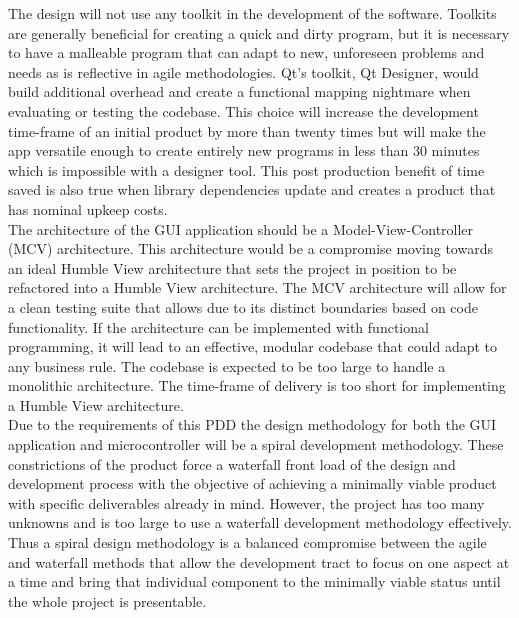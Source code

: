 \documentclass[12pt]{article}
\begin{document}
\indent
The design will not use any toolkit in the development of the software.  Toolkits are generally beneficial for creating a quick and dirty program, but it is necessary to have a malleable program that can adapt to new, unforeseen problems and needs as is reflective in agile methodologies.  Qt’s toolkit, Qt Designer, would build additional overhead and create a functional mapping nightmare when evaluating or testing the codebase.  This choice will increase the development time-frame of an initial product by more than twenty times but will make the app versatile enough to create entirely new programs in less than 30 minutes which is impossible with a designer tool.  This post production benefit of time saved is also true when library dependencies update and creates a product that has nominal upkeep costs.\\

\indent
The architecture of the GUI application should be a Model-View-Controller (MCV) architecture.  This architecture would be a compromise moving towards an ideal Humble View architecture that sets the project in position to be refactored into a Humble View architecture.  The MCV architecture will allow for a clean testing suite that allows due to its distinct boundaries based on code functionality.  If the architecture can be implemented with functional programming, it will lead to an effective, modular codebase that could adapt to any business rule.  The codebase is expected to be too large to handle a monolithic architecture.  The time-frame of delivery is too short for implementing a Humble View architecture.\\

\indent
Due to the requirements of this PDD the design methodology for both the GUI application and microcontroller will be a spiral development methodology.  These constrictions of the product force a waterfall front load of the design and development process with the objective of achieving a minimally viable product with specific deliverables already in mind.  However, the project has too many unknowns and is too large to use a waterfall development methodology effectively.  Thus a spiral design methodology is a balanced compromise between the agile and waterfall methods that allow the development tract to focus on one aspect at a time and bring that individual component to the minimally viable status until the whole project is presentable.\\
\hfill \\
\pagebreak
\end{document}
